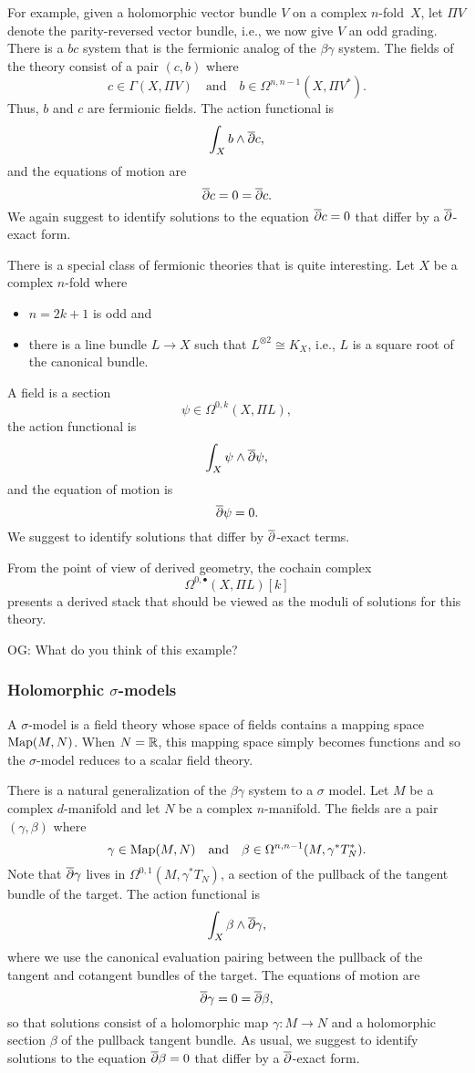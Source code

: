 \documentclass[11pt]{amsart}
\def\owen#1{{\textcolor{violet!50!black}{OG: {#1}}}}
\begin{document}
For example, given a holomorphic vector bundle $V$ on a complex $n$-fold~$X$,
let $\Pi V$ denote the parity-reversed vector bundle,
i.e., we now give $V$ an odd grading.
There is a $bc$ system that is the fermionic analog of the $\beta\gamma$ system.
The fields of the theory consist of a pair $(c,b)$ where 
\[
c \in \Gamma(X,\Pi V) \quad\text{and}\quad b \in \Omega^{n,n-1}(X,\Pi V^*) .
\]
Thus, $b$ and $c$ are fermionic fields.
The action functional is 
\[
\int_X b \wedge {\overline{\partial}} c,
\]
and the equations of motion are
\[
{\overline{\partial}} c = 0 = {\overline{\partial}} c.
\]
We again suggest to identify solutions to the equation ${\overline{\partial}} c = 0$ that differ by a ${\overline{\partial}}$-exact form.

There is a special class of fermionic theories that is quite interesting.
Let $X$ be a complex $n$-fold where
\begin{itemize}
\item $n = 2k+1$ is odd and
\item there is a line bundle $L \to X$ such that $L^{\otimes 2} \cong K_X$,
i.e., $L$ is a square root of the canonical bundle.
\end{itemize}
A field is a section
\[
\psi \in \Omega^{0,k}(X,\Pi L),
\]
the action functional is
\[ 
\int_X \psi \wedge {\overline{\partial}} \psi,
\]
and the equation of motion is
\[
{\overline{\partial}} \psi = 0.
\]
We suggest to identify solutions that differ by ${\overline{\partial}}$-exact terms.

From the point of view of derived geometry, the cochain complex
\[
\Omega^{0,\bullet}(X, \Pi L)[k]
\]
presents a derived stack that should be viewed as the moduli of solutions for this theory.

\owen{What do you think of this example?}

\subsubsection{Holomorphic $\sigma$-models}

A $\sigma$-model is a field theory whose space of fields contains a mapping space ${\rm Map}(M,N)$.
When $N = \mathbb R$, this mapping space simply becomes functions and so the $\sigma$-model reduces to a scalar field theory.

There is a natural generalization of the $\beta\gamma$ system to a $\sigma$ model.
Let $M$ be a complex $d$-manifold and let $N$ be a complex $n$-manifold.
The fields are a pair $(\gamma, \beta)$ where
\[
\gamma \in {\rm Map}(M,N) \quad\text{and}\quad \beta \in \Omega^{n,n-1}(M,\gamma^* T^*_N) .
\]
Note that ${\overline{\partial}} \gamma$ lives in $\Omega^{0,1}(M, \gamma^* T_N)$, 
a section of the pullback of the tangent bundle of the target.
The action functional is 
\[
\int_X \beta \wedge {\overline{\partial}} \gamma,
\]
where we use the canonical evaluation pairing between the pullback of the tangent and cotangent bundles of the target.
The equations of motion are
\[
{\overline{\partial}} \gamma = 0 = {\overline{\partial}} \beta,
\]
so that solutions consist of a holomorphic map $\gamma: M \to N$ and a holomorphic section $\beta$ of the pullback tangent bundle.
As usual, we suggest to identify solutions to the equation ${\overline{\partial}} \beta = 0$ that differ by a ${\overline{\partial}}$-exact form.
\end{document}
